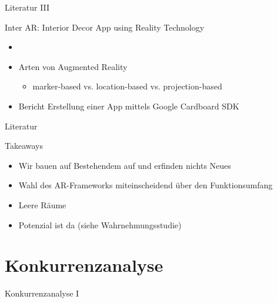 \documentclass[presentation,bigger,aspectratio=169]{beamer}
\begin{document}
\begin{frame}[label={sec:orgfc2c8b2}]{Literatur III}
\begin{block}{Inter AR: Interior Decor App using Reality Technology}
\begin{itemize}
\item \textcite{moaresInterARInterior2020}
\item Arten von Augmented Reality
\begin{itemize}
\item marker-based vs. location-based vs. projection-based
\end{itemize}
\item Bericht Erstellung einer App mittels Google Cardboard SDK
\end{itemize}
\end{block}
\end{frame}

\begin{frame}[label={sec:org1cfa442}]{Literatur}
\begin{block}{Takeaways}
\begin{itemize}
\item Wir bauen auf Bestehendem auf und erfinden nichts Neues
\item Wahl des AR-Frameworks miteinscheidend über den Funktionsumfang
\item Leere Räume
\item Potenzial ist da (siehe Wahrnehmungsstudie)
\end{itemize}
\end{block}
\end{frame}

\section{Konkurrenzanalyse}
\label{sec:org92de7b3}
\begin{frame}[label={sec:org50dbff8}]{\vspace{2.2cm}\begin{center}\MakeUppercase{\insertsection}\end{center}}
\end{frame}

\begin{frame}[label={sec:orgffda3b9}]{Konkurrenzanalyse I}
\end{frame}
\end{document}
